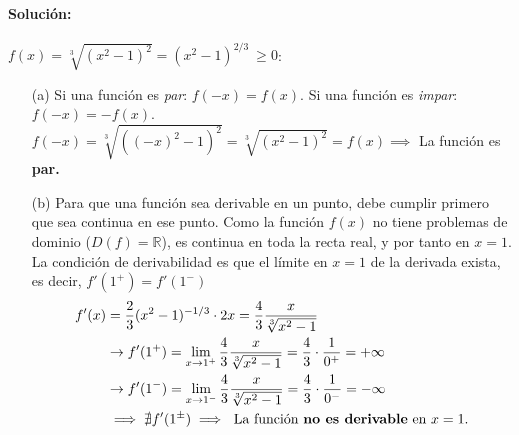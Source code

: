 \paragraph{Solución:} $f(x)=\sqrt[3]{(x^2-1)^2}=(x^2-1)^{2/3} \ \ge0$:
\begin{enumerate}
    \item[(a)] Si una función es \emph{par}: $f(-x)=f(x)$. Si una función es \emph{impar}: $f(-x)=-f(x)$.\\
    
    $ f(-x)=\sqrt[3]{((-x)^2-1)^2}=\sqrt[3]{(x^2-1)^2}=f(x)\implies $ La función es \textbf{par.}
    \item[(b)] Para que una función sea derivable en un punto, debe cumplir primero que sea continua en ese punto. Como la función $f(x)$ no tiene problemas de dominio ($D(f)=\mathbb{R}$), es continua en toda la recta real, y por tanto en $x=1$. La condición de derivabilidad es que el límite en $x=1$ de la derivada exista, es decir, $f'(1^+)=f'(1^-)$
    \begin{equation*}
        \begin{split}
            f'(x)&=\frac{2}{3}(x^2-1)^{-1/3}\cdot 2x=\frac{4}{3}\frac{x}{\sqrt[3]{x^2-1}}\\
            &\rightarrow f'(1^+)=\lim_{x\to 1^+} \frac{4}{3}\frac{x}{\sqrt[3]{x^2-1}}=\frac{4}{3}\cdot \frac{1}{0^+}=+\infty\\
            &\rightarrow f'(1^-)=\lim_{x\to 1^-} \frac{4}{3}\frac{x}{\sqrt[3]{x^2-1}}=\frac{4}{3}\cdot \frac{1}{0^-}=-\infty\\
            &\implies \nexists f'(1^\pm) \implies \text{ La función \textbf{no es derivable} en }x=1.
        \end{split}
    \end{equation*}


\end{enumerate}
